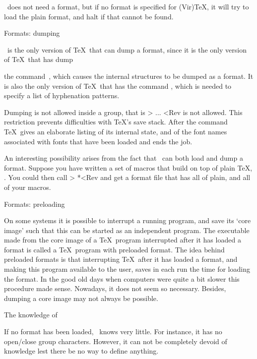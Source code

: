 \IniTeX\ does not need a format,
but if no format is specified for (Vir)\TeX, it will try to
load the plain format, and halt if that cannot be found.

\spoint Formats: dumping

\IniTeX\ is the only version of \TeX\ 
that can dump a format, since it is
the only version of \TeX\ that has
\csterm dump\par
the command~,
which causes the internal structures
to be dumped as a format.
It is also the only version of \TeX\ that has the command
, which
is needed to specify a list of hyphenation
patterns.

Dumping is not allowed inside a group, that is
\Ver>{ ... \dump }<Rev is not allowed. This restriction
prevents difficulties with \TeX's save stack.
After the  command \TeX\ gives an elaborate listing of
its internal state, and of the font names associated with
fonts that have been loaded and ends the job.

An interesting possibility arises from the fact that
\IniTeX\ can both load and dump a format.
Suppose you have written a set of macros that build
on top of plain \TeX, .
You could then call
\Ver>%
*\dump<Rev
and get a format file  that
has all of plain, and all of your macros.

\spoint Formats: preloading

On some systems it is possible to interrupt a running program,
and save its `core image' such that this can be started as
an independent program. 
The executable made from the
core image of a \TeX\ program interrupted after it has loaded 
a format is called a \TeX\ program with preloaded format.
The idea behind preloaded formats is
that interrupting \TeX\ after it has loaded a format, and making
this program available to the user, 
saves in each run the time for loading the format.
In the good old days when computers were quite a bit slower
this procedure made sense.
Nowadays, it does not seem so necessary.
Besides, dumping a core image may not always be possible.

\spoint The knowledge of \IniTeX

If no format has been loaded, \IniTeX\ knows very little.
For instance, it has no open/close group characters.
However, it can not be completely devoid of knowledge
lest there be no way to define anything.

